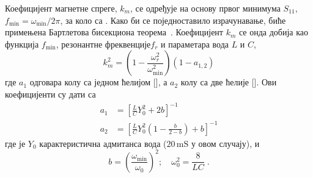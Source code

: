 Коефицијент магнетне спреге, $k_m$, се одређује на основу првог минимума $S_{11}$, $f_\text{min}=\omega_\text{min}/2\pi$,  за коло са . Како би се поједноставило израчунавање, биће примењена Бартлетова бисекциона теорема~\cite{bib20}. Коефицијент $k_m$ се онда добија као функција $f_\text{min}$, резонантне фреквенције$f_r$ и параметара вода $L$ и $C$,
\begin{equation}
k_m^2 = \left( 1 - \frac{\omega_r^2}{\omega_\text{min}^2} \right) \left( 1 - a_{1,2} \right) 
\end{equation}
где $a_1$ одговара колу са једном ћелијом [], а $a_2$ колу са две ћелије []. Ови коефицијенти су дати са
\begin{align}
a_1 & = \left[ \frac{L}{C}Y_0^2 + 2b \right]^{-1} \\
a_2 & = \left[ \frac{L}{C}Y_0^2 \left( 1 - \frac{b}{2-b} \right) + b \right]^{-1} 
\end{align}
где је $Y_0$ карактеристична адмитанса вода ($20\,\mathrm{mS}$ у овом случају), и 
\begin{equation*}
b  = \left( \frac{\omega_\text{min}}{\omega_0} \right)^2;\quad
\omega_0^2=\frac{8}{LC}\;.
\end{equation*}
